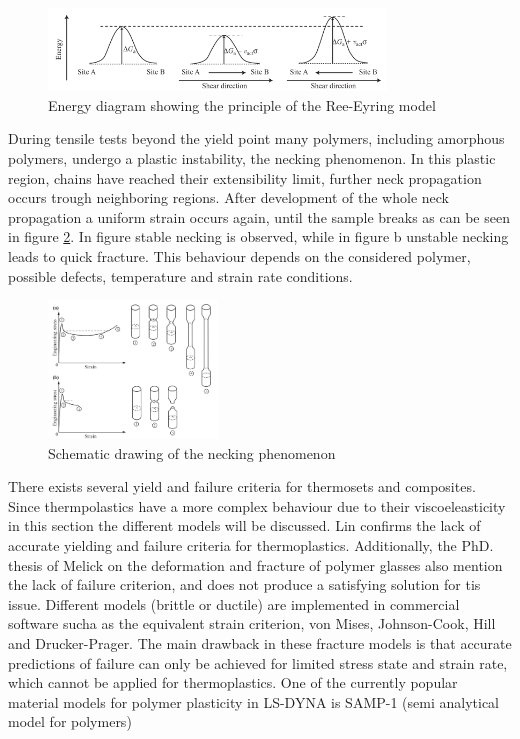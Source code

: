 \begin{figure}[H]
    \centering
    \includegraphics[width=0.8\textwidth]{chapter_2/figures/Ree-Eyring.png}
    \caption{Energy diagram showing the principle of the Ree-Eyring model \cite{Halary2011PolymerMaterials}}
    \label{fig:Ree-Eyring}
\end{figure}
During tensile tests beyond the yield point many polymers, including amorphous polymers, undergo a plastic instability, the necking phenomenon. In this plastic region, chains have reached their extensibility limit, further neck propagation occurs trough neighboring regions. After development of the whole neck propagation a uniform strain occurs again, until the sample breaks as can be seen in figure \ref{fig:Necking}. In figure stable necking is observed, while in figure b unstable necking leads to quick fracture. This behaviour depends on the considered polymer, possible defects, temperature and strain rate conditions. 
\begin{figure}[H]
    \centering
    \includegraphics[width=0.4\textwidth]{chapter_2/figures/Necking.png}
    \caption{Schematic drawing of the necking phenomenon \cite{Halary2011PolymerMaterials}}
    \label{fig:Necking}
\end{figure}
There exists several yield and failure criteria for thermosets and composites. Since thermpolastics have a more complex behaviour due to their viscoeleasticity in this section the different models will be discussed. 
Lin\cite{Lin2013StressLoading} confirms the lack of accurate yielding and failure criteria for thermoplastics. Additionally, the PhD. thesis of Melick \cite{Melick2002DeformationGlasses} on the deformation and fracture of polymer glasses also mention the lack of failure criterion, and does not produce a satisfying solution for tis issue. Different  models (brittle or ductile) are implemented in commercial software sucha as the equivalent strain criterion, von Mises, Johnson-Cook, Hill and Drucker-Prager. The main drawback in these fracture models is that accurate predictions of failure can only be achieved for limited stress state and strain rate, which cannot be applied for thermoplastics. One of the currently popular material models for polymer plasticity  in LS-DYNA is SAMP-1 (semi analytical model for polymers)

